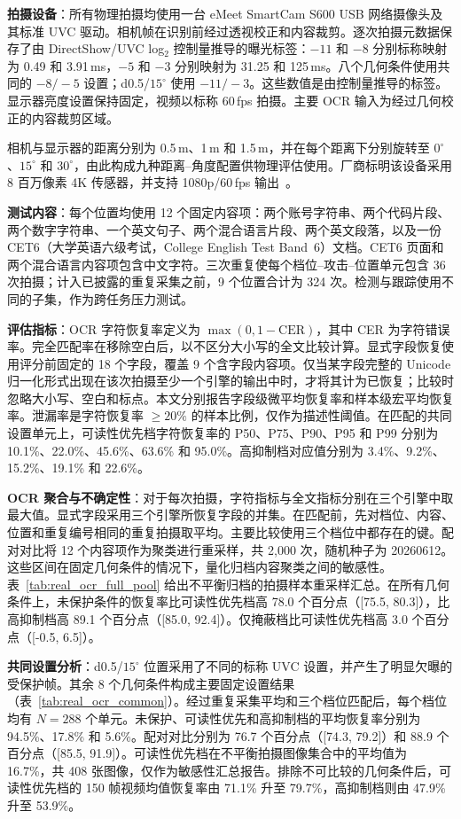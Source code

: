 \documentclass{ieeeaccess}
\begin{document}
\textbf{拍摄设备}：所有物理拍摄均使用一台 eMeet SmartCam S600 USB 网络摄像头及其标准 UVC 驱动。相机帧在识别前经过透视校正和内容裁剪。逐次拍摄元数据保存了由 DirectShow/UVC log$_2$ 控制量推导的曝光标签：$-11$ 和 $-8$ 分别标称映射为 0.49 和 3.91\,ms，$-5$ 和 $-3$ 分别映射为 31.25 和 125\,ms。八个几何条件使用共同的 $-8/-5$ 设置；d0.5/$15^{\circ}$ 使用 $-11/-3$。这些数值是由控制量推导的标签。显示器亮度设置保持固定，视频以标称 60\,fps 拍摄。主要 OCR 输入为经过几何校正的内容裁剪区域。

相机与显示器的距离分别为 0.5\,m、1\,m 和 1.5\,m，并在每个距离下分别旋转至 $0^{\circ}$、$15^{\circ}$ 和 $30^{\circ}$，由此构成九种距离--角度配置供物理评估使用。厂商标明该设备采用 8 百万像素 4K 传感器，并支持 1080p/60\,fps 输出~\cite{b_emeet_s600}。

\textbf{测试内容}：每个位置均使用 12 个固定内容项：两个账号字符串、两个代码片段、两个数字字符串、一个英文句子、两个混合语言片段、两个英文段落，以及一份 CET6（大学英语六级考试，College English Test Band~6）文档。CET6 页面和两个混合语言内容项包含中文字符。三次重复使每个档位--攻击--位置单元包含 36 次拍摄；计入已披露的重复采集之前，9 个位置合计为 324 次。检测与跟踪使用不同的子集，作为跨任务压力测试。

\textbf{评估指标}：OCR 字符恢复率定义为 $\max(0,1-\mathrm{CER})$，其中 CER 为字符错误率。完全匹配率在移除空白后，以不区分大小写的全文比较计算。显式字段恢复使用评分前固定的 18 个字段，覆盖 9 个含字段内容项。仅当某字段完整的 Unicode 归一化形式出现在该次拍摄至少一个引擎的输出中时，才将其计为已恢复；比较时忽略大小写、空白和标点。本文分别报告字段级微平均恢复率和样本级宏平均恢复率。泄漏率是字符恢复率 $\geq20\%$ 的样本比例，仅作为描述性阈值。在匹配的共同设置单元上，可读性优先档字符恢复率的 P50、P75、P90、P95 和 P99 分别为 10.1\%、22.0\%、45.6\%、63.6\% 和 95.0\%。高抑制档对应值分别为 3.4\%、9.2\%、15.2\%、19.1\% 和 22.6\%。

\textbf{OCR 聚合与不确定性}：对于每次拍摄，字符指标与全文指标分别在三个引擎中取最大值。显式字段采用三个引擎所恢复字段的并集。在匹配前，先对档位、内容、位置和重复编号相同的重复拍摄取平均。主要比较使用三个档位中都存在的键。配对对比将 12 个内容项作为聚类进行重采样，共 2,000 次，随机种子为 20260612。这些区间在固定几何条件的情况下，量化归档内容聚类之间的敏感性。表~\ref{tab:real_ocr_full_pool} 给出不平衡归档的拍摄样本重采样汇总。在所有几何条件上，未保护条件的恢复率比可读性优先档高 78.0 个百分点（[75.5, 80.3]），比高抑制档高 89.1 个百分点（[85.0, 92.4]）。仅掩蔽档比可读性优先档高 3.0 个百分点（[-0.5, 6.5]）。

\textbf{共同设置分析}：d0.5/$15^{\circ}$ 位置采用了不同的标称 UVC 设置，并产生了明显欠曝的受保护帧。其余 8 个几何条件构成主要固定设置结果（表~\ref{tab:real_ocr_common}）。经过重复采集平均和三个档位匹配后，每个档位均有 $N=288$ 个单元。未保护、可读性优先和高抑制档的平均恢复率分别为 94.5\%、17.8\% 和 5.6\%。配对对比分别为 76.7 个百分点（[74.3, 79.2]）和 88.9 个百分点（[85.5, 91.9]）。可读性优先档在不平衡拍摄图像集合中的平均值为 16.7\%，共 408 张图像，仅作为敏感性汇总报告。排除不可比较的几何条件后，可读性优先档的 150 帧视频均值恢复率由 71.1\% 升至 79.7\%，高抑制档则由 47.9\% 升至 53.9\%。
\end{document}
